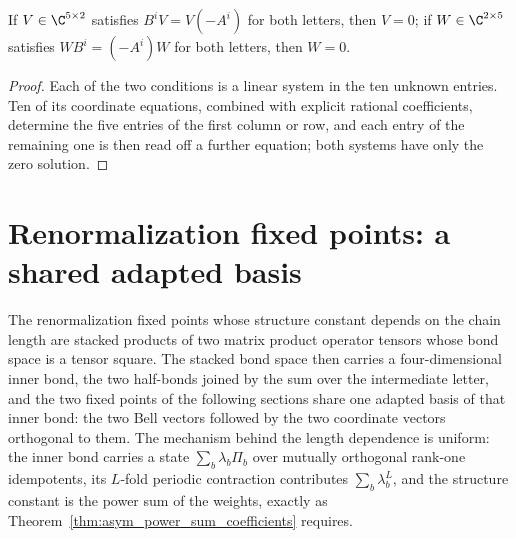 \begin{theorem}
    \label{thm:asymex_parity_no_intertwiner}
    \leanok
    If $V\in\C^{5\times2}$ satisfies $B^iV=V(-A^i)$ for both letters, then
    $V=0$; if $W\in\C^{2\times5}$ satisfies $WB^i=(-A^i)W$ for both
    letters, then $W=0$.
\end{theorem}

\begin{proof}
    \leanok
    Each of the two conditions is a linear system in the ten unknown
    entries. Ten of its coordinate equations, combined with explicit
    rational coefficients, determine the five entries of the first column or
    row, and each entry of the remaining one is then read off a further
    equation; both systems have only the zero solution.
\end{proof}

\section{Renormalization fixed points: a shared adapted basis}%
\label{sec:asymex_rfp_basis}

The renormalization fixed points whose structure constant depends on the
chain length are stacked products of two matrix product operator tensors
whose bond space is a tensor square. The stacked bond space then carries a
four-dimensional inner bond, the two half-bonds joined by the sum over the
intermediate letter, and the two fixed points of the following sections
share one adapted basis of that inner bond: the two Bell vectors followed
by the two coordinate vectors orthogonal to them. The mechanism behind the
length dependence is uniform: the inner bond carries a state
$\sum_b\lambda_b\Pi_b$ over mutually orthogonal rank-one idempotents, its
$L$-fold periodic contraction contributes $\sum_b\lambda_b^L$, and the
structure constant is the power sum of the weights, exactly as
Theorem~\ref{thm:asym_power_sum_coefficients} requires.


